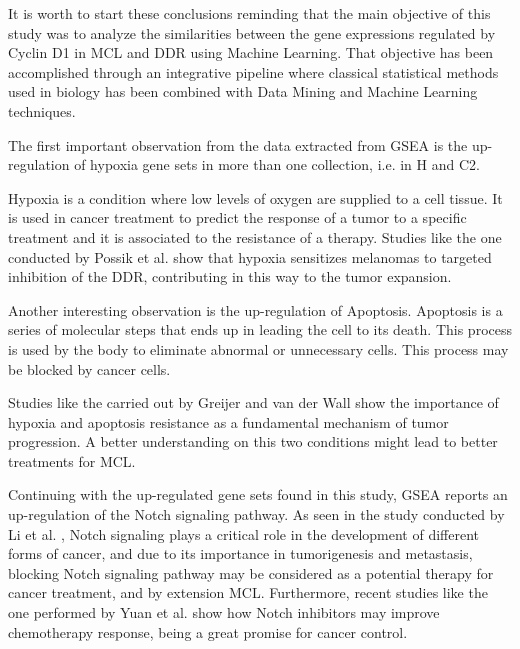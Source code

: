\onehalfspacing


It is worth to start these conclusions reminding that the main objective of this study was to analyze the similarities between the gene expressions regulated by Cyclin D1 in MCL and DDR using Machine Learning. That objective has been accomplished through an integrative pipeline where classical statistical methods used in biology has been combined with Data Mining and Machine Learning techniques.

The first important observation from the data extracted from GSEA is the up-regulation of hypoxia gene sets in more than one collection, i.e. in H and C2.

Hypoxia is a condition where low levels of oxygen are supplied to a cell tissue. It is used in cancer treatment to predict the response of a tumor to a specific treatment and it is associated to the resistance of a therapy. Studies like the one conducted by Possik et al. \cite{Possik2014} show that hypoxia sensitizes melanomas to targeted inhibition of the DDR, contributing in this way to the tumor expansion.

Another interesting observation is the up-regulation of Apoptosis. Apoptosis is a series of molecular steps that ends up in leading the cell to its death. This process is used by the body to eliminate abnormal or unnecessary cells. This process may be blocked by cancer cells.

Studies like the carried out by Greijer and van der Wall \cite{Greijer2004} show the importance of hypoxia and apoptosis resistance as a fundamental mechanism of tumor progression. A better understanding on this two conditions might lead to better treatments for MCL.

Continuing with the up-regulated gene sets found in this study, GSEA reports an up-regulation of the Notch signaling pathway. As seen in the study conducted by Li et al. \cite{Li2017}, Notch signaling plays a critical role in the development of different forms of cancer, and due to its importance in tumorigenesis and metastasis, blocking Notch signaling pathway may be considered as a potential therapy for cancer treatment, and by extension MCL.
Furthermore, recent studies like the one performed by Yuan et al. \cite{Yuan2015} show how Notch inhibitors may improve chemotherapy response, being a great promise for cancer control.

